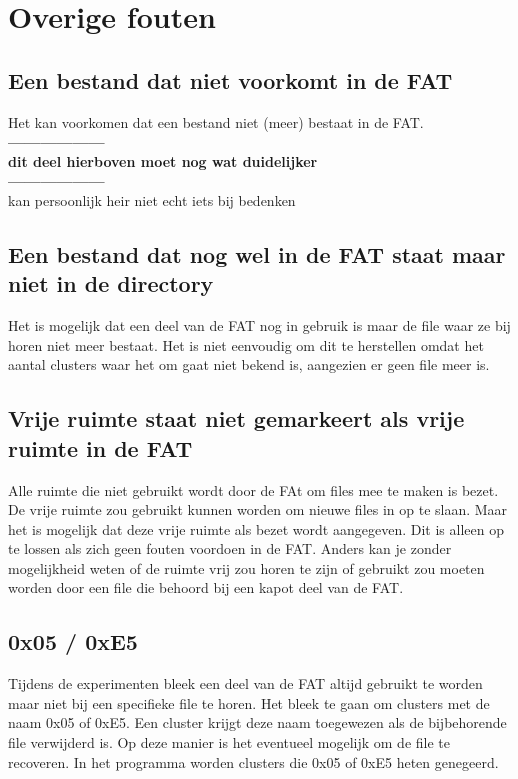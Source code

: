 \documentclass[11pt]{article}
\begin{document}
	\newpage

	\section{Overige fouten}\label{sec:overige}
	\subsection{Een bestand dat niet voorkomt in de FAT}\label{sec:dir}
	Het kan voorkomen dat een bestand niet (meer) bestaat in de FAT.\\
\textbf{------------------\\dit deel hierboven moet nog wat duidelijker \\------------------}\\
kan persoonlijk heir niet echt iets bij bedenken 

	\subsection{Een bestand dat nog wel in de FAT staat maar niet in de directory}\label{sec:fat}
	Het is mogelijk dat een deel van de FAT nog in gebruik is maar de file waar ze bij horen niet meer bestaat. Het is niet eenvoudig om dit te herstellen omdat het aantal clusters waar het om gaat niet bekend is, aangezien er geen file meer is.

	\subsection{Vrije ruimte staat niet gemarkeert als vrije ruimte in de FAT}\label{sec:vrij}
	Alle ruimte die niet gebruikt wordt door de FAt om files mee te maken is bezet. De vrije ruimte zou gebruikt kunnen worden om nieuwe files in op te slaan. Maar het is mogelijk dat deze vrije ruimte als bezet wordt aangegeven. Dit is alleen op te lossen als zich geen fouten voordoen in de FAT. Anders kan je zonder mogelijkheid weten of de ruimte vrij zou horen te zijn of gebruikt zou moeten worden door een file die behoord bij een kapot deel van de FAT.

	\subsection{0x05 / 0xE5}\label{sec:0xE5}
	Tijdens de experimenten bleek een deel van de FAT altijd gebruikt te worden maar niet bij een specifieke file te horen. Het bleek te gaan om clusters met de naam 0x05 of 0xE5. Een cluster krijgt deze naam toegewezen als de bijbehorende file verwijderd is. Op deze manier is het eventueel mogelijk om de file te recoveren. In het programma worden clusters die 0x05 of 0xE5 heten genegeerd. 
\end{document}
